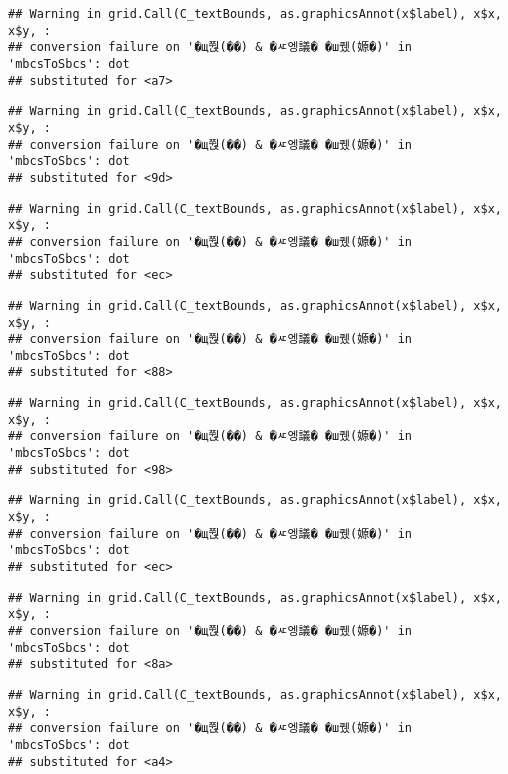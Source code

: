 \documentclass[
]{article}
\begin{document}
\begin{verbatim}
## Warning in grid.Call(C_textBounds, as.graphicsAnnot(x$label), x$x, x$y, :
## conversion failure on '�щ쭩(��) & �ㅼ엥議� �ш퀬(嫄�)' in 'mbcsToSbcs': dot
## substituted for <a7>
\end{verbatim}

\begin{verbatim}
## Warning in grid.Call(C_textBounds, as.graphicsAnnot(x$label), x$x, x$y, :
## conversion failure on '�щ쭩(��) & �ㅼ엥議� �ш퀬(嫄�)' in 'mbcsToSbcs': dot
## substituted for <9d>
\end{verbatim}

\begin{verbatim}
## Warning in grid.Call(C_textBounds, as.graphicsAnnot(x$label), x$x, x$y, :
## conversion failure on '�щ쭩(��) & �ㅼ엥議� �ш퀬(嫄�)' in 'mbcsToSbcs': dot
## substituted for <ec>
\end{verbatim}

\begin{verbatim}
## Warning in grid.Call(C_textBounds, as.graphicsAnnot(x$label), x$x, x$y, :
## conversion failure on '�щ쭩(��) & �ㅼ엥議� �ш퀬(嫄�)' in 'mbcsToSbcs': dot
## substituted for <88>
\end{verbatim}

\begin{verbatim}
## Warning in grid.Call(C_textBounds, as.graphicsAnnot(x$label), x$x, x$y, :
## conversion failure on '�щ쭩(��) & �ㅼ엥議� �ш퀬(嫄�)' in 'mbcsToSbcs': dot
## substituted for <98>
\end{verbatim}

\begin{verbatim}
## Warning in grid.Call(C_textBounds, as.graphicsAnnot(x$label), x$x, x$y, :
## conversion failure on '�щ쭩(��) & �ㅼ엥議� �ш퀬(嫄�)' in 'mbcsToSbcs': dot
## substituted for <ec>
\end{verbatim}

\begin{verbatim}
## Warning in grid.Call(C_textBounds, as.graphicsAnnot(x$label), x$x, x$y, :
## conversion failure on '�щ쭩(��) & �ㅼ엥議� �ш퀬(嫄�)' in 'mbcsToSbcs': dot
## substituted for <8a>
\end{verbatim}

\begin{verbatim}
## Warning in grid.Call(C_textBounds, as.graphicsAnnot(x$label), x$x, x$y, :
## conversion failure on '�щ쭩(��) & �ㅼ엥議� �ш퀬(嫄�)' in 'mbcsToSbcs': dot
## substituted for <a4>
\end{verbatim}
\end{document}
